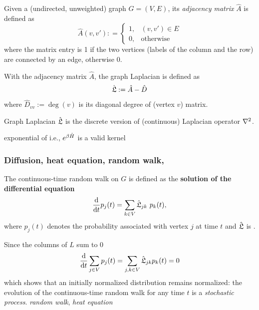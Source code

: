 \begin{definition}\label{def:adjacency_matrix}
	Given a (undirected, unweighted) graph $G=(V,E)$, its \emph{adjacency matrix} $\hat{A}$ is defined as
	\begin{equation}
		\hat{A}(v,v') : = 
		\begin{cases}
			1, & (v,v') \in E \\
			0, & \text{otherwise}
		\end{cases}
	\end{equation}
	where the matrix entry is 1 if the two vertices (labels of the column and the row) are connected by an edge, otherwise 0.
\end{definition}
\begin{definition}\label{def:graph_laplacian}
	With the adjacency matrix $\hat{A}$, the graph Laplacian is defined as
	\begin{equation}
		\hat{\mathfrak{L}}:=\hat{A}-\hat{D}	
	\end{equation}
	where $\hat{D}_{vv}:=\deg(v)$ is its diagonal degree of (vertex $v$) matrix.
\end{definition}
\begin{remark}
	Graph Laplacian $\hat{\mathfrak{L}}$ is the 
	discrete version of (continuous) Laplacian operator $\laplacian$.
\end{remark}
\begin{lemma}
	exponential of i.e., $e^{\beta \hat{H}}$ is a valid kernel
\end{lemma}

\subsubsection{Diffusion, heat equation, random walk,}
The continuous-time random walk on $G$ is defined as the \textbf{solution of the differential equation}
\begin{equation}
	\dv{t} p_j(t)
	=
	\sum_{k\in V} \hat{\mathfrak{L}}_{jk} \ p_k(t),
	\label{eq:continuous_time_random_walk}
\end{equation}
where $p_j(t)$ denotes the probability associated with vertex $j$ at time $t$
and $\hat{\mathfrak{L}}$ is .

Since the columns of $L$ sum to 0
\begin{equation}
	\dv{t} \sum_{j\in V} p_j (t) = 
	\sum_{j,k\in V} \hat{\mathfrak{L}}_{jk}  p_k(t) = 0
\end{equation}
which shows that an initially normalized distribution remains normalized:
the evolution of the continuous-time random walk for any time $t$ is a \emph{stochastic process}.
\emph{random walk}, \emph{heat equation}

